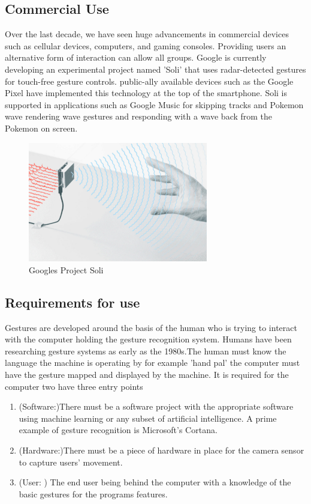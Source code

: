 \subsection{Commercial Use}
Over the last decade, we have seen huge advancements in commercial devices such as cellular devices, computers, and gaming consoles. Providing users an alternative form of interaction can allow all groups. Google is currently developing an experimental project named 'Soli' that uses radar-detected gestures for touch-free gesture controls.
public-ally available devices such as the Google Pixel have implemented this technology at the top of the smartphone. Soli is supported in applications such as Google Music for skipping tracks and Pokemon wave rendering wave gestures and responding with a wave back from the Pokemon on screen.


  
  \begin{figure}[h!]
  \centering
    \includegraphics[width=0.7\textwidth]{Research-Latex/images/GoogleRadar.jpg}
     \caption{Googles Project  Soli}
\end{figure}
  
\subsection{Requirements for use }

Gestures are developed around the basis of the human who is trying to interact with the computer holding the gesture recognition system. Humans have been researching gesture systems as early as the 1980s.The human must know the language the machine is operating by for example 'hand pal' the computer must have the gesture mapped and displayed by the machine. It is required for the computer two have three entry points 
\begin{enumerate}
  \item (Software:)There must be a software project with the appropriate software using machine learning or any subset of artificial intelligence. A prime example of gesture recognition is Microsoft's Cortana.
  \item (Hardware:)There must be a piece of hardware in place for the camera sensor to capture users' movement.
\item (User: ) The end user being behind the computer with a knowledge of the basic gestures for the programs features.

\end{enumerate}




